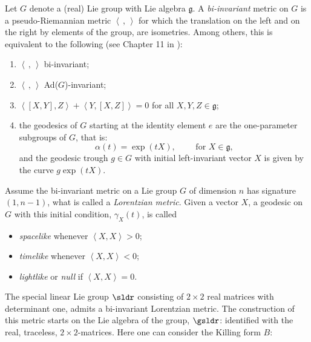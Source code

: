 \documentclass[11pt]{amsart}
\newcommand{\lela}{\left \langle}
\newcommand{\rira}{\right \rangle}
\newcommand{\bil}{\lela\,,\,\rira}
\newcommand{\mgg}{\mathfrak g }
\theoremstyle{plain}
\theoremstyle{definition}
\theoremstyle{remark}
\begin{document}
Let $G$ denote a (real) Lie group with Lie algebra $\mgg$. 
A \textit{bi-invariant} metric on  $G$ is a pseudo-Riemannian metric $\bil$ for which the translation on the left and on the right by elements of the group, are isometries. Among others, this is equivalent to the following (see Chapter 11 in \cite{ON}):
\begin{enumerate}\label{[(i)]}
\item $\bil$ bi-invariant;
\item $\bil$ Ad($G$)-invariant;
\item $\lela [X, Y], Z\rira + \lela Y, [X, Z]\rira= 0$ for all $X, Y, Z \in\mgg$;
\item the geodesics of $G$ starting at the identity element $e$ are the one-parameter subgroups of $G$, that is:
\begin{equation}\label{onepara}
\alpha(t)=\exp(tX), \qquad \mbox{ for }X  \in \mgg, 
\end{equation}
and the geodesic trough $g\in G$ with initial left-invariant vector $X$ is given by the curve $g\exp(tX)$. 
\end{enumerate}
Assume the bi-invariant metric on a Lie group $G$ of dimension $n$ has signature $(1,n-1)$, what is called a {\em Lorentzian metric}. Given a vector $X$, a geodesic on $G$ with this initial condition, $\gamma_X(t)$,   is called 
\begin{itemize}
\item {\em spacelike} whenever $\lela X,X \rira >0$;
\item {\em timelike} whenever $\lela X,X \rira < 0$;
\item {\em lightlike} or {\em null}  if  $\lela X,X \rira = 0$.
\end{itemize}

The special linear Lie group $\sldr$ consisting of  $2 \times 2$ real matrices with determinant one,  admits a bi-invariant Lorentzian metric. The construction of this metric starts on the Lie algebra of the group, $\gsldr$: identified with the real, traceless, $2 \times 2$-matrices. Here one can consider the Killing form $B$:
\end{document}
